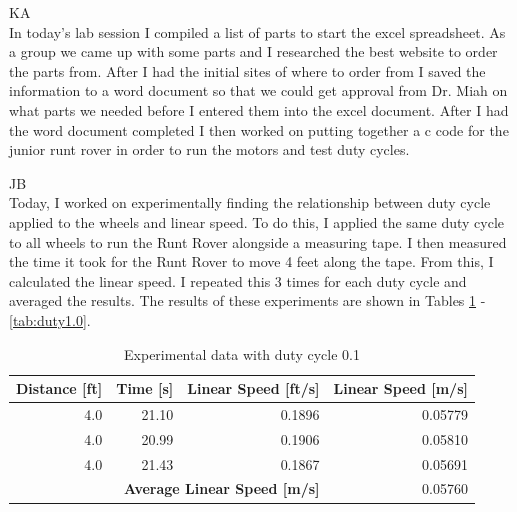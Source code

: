 \documentclass[fontsize=11pt, %
                             paper=letter, %
                             openany, %
                             captions=tableheading,
                             index=totoc,
                             hyperref]{labbook}
\begin{document}
\begin{addmargin}[0cm]{0cm}


KA\\
In today's lab session I compiled a list of parts to start the excel spreadsheet. As a group we came up with some parts and I researched the best website to order the parts from. After I had the initial sites of where to order from I saved the information to a word document so that we could get approval from Dr. Miah on what parts we needed before I entered them into the excel document. After I had the word document completed I then worked on putting together a c code for the junior runt rover in order to run the motors and test duty cycles.

\vspace*{12pt}
JB\\
Today, I worked on experimentally finding the relationship between duty cycle applied to the wheels and linear speed. To do this, I applied the same duty cycle to all wheels to run the Runt Rover alongside a measuring tape. I then measured the time it took for the Runt Rover to move 4 feet along the tape. From this, I calculated the linear speed. I repeated this 3 times for each duty cycle and averaged the results. The results of these experiments are shown in Tables \ref{tab:duty0.1} - \ref{tab:duty1.0}.

\begin{table}[h!]
    \centering
    \begin{tabular}{r|r|r|r}
        \toprule
        \textbf{Distance [ft]} & \textbf{Time [s]} & \textbf{Linear Speed [ft/s]} & \textbf{Linear Speed [m/s]}\\
        \toprule
        4.0 & 21.10 & 0.1896 & 0.05779\\
        4.0 & 20.99 & 0.1906 & 0.05810\\
        4.0 & 21.43 & 0.1867 & 0.05691\\
        \bottomrule
        \multicolumn{3}{r|}{\textbf{Average Linear Speed [m/s]}} & 0.05760\\
        \bottomrule
    \end{tabular}
    \caption{Experimental data with duty cycle 0.1}
    \label{tab:duty0.1}
\end{table}


\end{addmargin}
\end{document}
